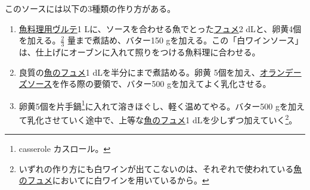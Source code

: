 \begin{recette}

 

このソースには以下の3種類の作り方がある。

\begin{enumerate}
\def\labelenumi{\arabic{enumi}.}
\item
  \protect\hyperlink{veloute-de-poisson}{魚料理用ヴルテ}1
  Lに、ソースを合わせる魚でとった\protect\hyperlink{fumet-de-poisson}{フュメ}2
  dLと、卵黄4個を加える。\(\frac{2}{3}\) 量まで煮詰め、バター150
  gを加える。この「白ワインソース」は、仕上げにオーブンに入れて照りをつける魚料理に合わせる。
\item
  良質の\protect\hyperlink{fumet-de-poisson}{魚のフュメ}1
  dLを半分にまで煮詰める。卵黄
  5個を加え、\protect\hyperlink{sauce-hollandaise}{オランデーズソース}を作る際の要領で、バター500
  gを加えてよく乳化させる。
\item
  卵黄5個を片手鍋\footnote{casserole カスロール。}に入れて溶きほぐし、軽く温めてやる。バター500
  gを加えて乳化させていく途中で、上等な\protect\hyperlink{fumet-de-poisson}{魚のフュメ}1
  dLを少しずつ加えていく\footnote{いずれの作り方にも白ワインが出てこないのは、それぞれで使われている\protect\hyperlink{fumet-de-poisson}{魚のフュメ}においてに白ワインを用いているから。}。
\end{enumerate}

\end{recette}